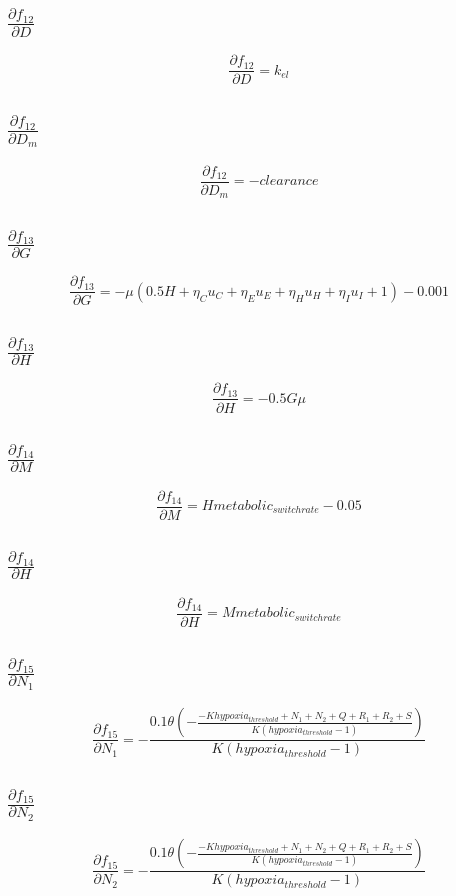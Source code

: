 \documentclass{article}
\begin{document}
\subsection{$\frac{\partial f_{12}}{\partial D}$}
\[
\frac{\partial f_{12}}{\partial D} = k_{el}
\]

\subsection{$\frac{\partial f_{12}}{\partial D_m}$}
\[
\frac{\partial f_{12}}{\partial D_m} = - clearance
\]

\subsection{$\frac{\partial f_{13}}{\partial G}$}
\[
\frac{\partial f_{13}}{\partial G} = - \mu \left(0.5 H + \eta_{C} u_{C} + \eta_{E} u_{E} + \eta_{H} u_{H} + \eta_{I} u_{I} + 1\right) - 0.001
\]

\subsection{$\frac{\partial f_{13}}{\partial H}$}
\[
\frac{\partial f_{13}}{\partial H} = - 0.5 G \mu
\]

\subsection{$\frac{\partial f_{14}}{\partial M}$}
\[
\frac{\partial f_{14}}{\partial M} = H metabolic_{switch rate} - 0.05
\]

\subsection{$\frac{\partial f_{14}}{\partial H}$}
\[
\frac{\partial f_{14}}{\partial H} = M metabolic_{switch rate}
\]

\subsection{$\frac{\partial f_{15}}{\partial N_1}$}
\[
\frac{\partial f_{15}}{\partial N_1} = - \frac{0.1 \theta\left(- \frac{- K hypoxia_{threshold} + N_{1} + N_{2} + Q + R_{1} + R_{2} + S}{K \left(hypoxia_{threshold} - 1\right)}\right)}{K \left(hypoxia_{threshold} - 1\right)}
\]

\subsection{$\frac{\partial f_{15}}{\partial N_2}$}
\[
\frac{\partial f_{15}}{\partial N_2} = - \frac{0.1 \theta\left(- \frac{- K hypoxia_{threshold} + N_{1} + N_{2} + Q + R_{1} + R_{2} + S}{K \left(hypoxia_{threshold} - 1\right)}\right)}{K \left(hypoxia_{threshold} - 1\right)}
\]
\end{document}
